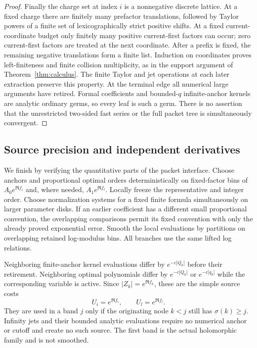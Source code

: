 \begin{proof}
Finally the charge set at index $i$ is a nonnegative discrete lattice.
At a fixed charge there are finitely many prefactor translations,
followed by Taylor powers of a finite set of lexicographically strict
positive shifts.  At a fixed current-coordinate budget only finitely
many positive current-first factors can occur; zero current-first
factors are treated at the next coordinate.  After a prefix is fixed,
the remaining negative translations form a finite list.  Induction on
coordinates proves left-finiteness and finite collision multiplicity,
as in the support argument of Theorem~\ref{thm:calculus}.
The finite Taylor and jet operations at each later extraction preserve
this property.  At the terminal edge all numerical large arguments
have retired.  Formal coefficients and bounded-$q$ infinite-anchor
kernels are analytic ordinary germs, so every leaf is such a germ.
There is no assertion that the unrestricted two-sided fast series or
the full packet tree is simultaneously convergent.
\end{proof}

\subsection{Source precision and independent derivatives}

We finish by verifying the quantitative parts of the packet interface.
Choose anchors and proportional optimal orders deterministically on
fixed-factor bins of $A_0e^{\Re f_i}$ and, where needed,
$A_1e^{\Re f_l}$.  Locally freeze the representative and integer order.
Choose normalization systems for a fixed finite formula simultaneously
on larger parameter disks.  If an earlier coefficient has a different
small proportional convention, the overlapping comparisons permit its
fixed convention with only the already proved exponential error.
Smooth the local evaluations by partitions on overlapping retained
log-modulus bins.  All branches use the same lifted log relations.

Neighboring finite-anchor kernel evaluations differ by
$e^{-c|Q_0|}$ before their retirement.  Neighboring optimal polynomials
differ by $e^{-c|Q_0|}$ or $e^{-c|q_0|}$ while the corresponding
variable is active.  Since $|Z_k|=e^{\Re f_k}$, these are the simple
source costs
\begin{equation}\label{eq:additive-simple-costs}
 U_i=e^{\Re f_i},\qquad U_l=e^{\Re f_l}.
\end{equation}
They are used in a band $j$ only if the originating node $k<j$ still
has $\sigma(k)\ge j$.  Infinity jets and their bounded analytic
evaluations require no numerical anchor or cutoff and create no such
source.  The first band is the actual holomorphic family and is not
smoothed.

